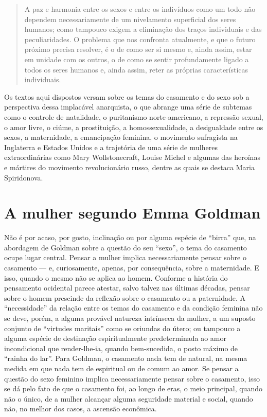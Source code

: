 \begin{quote}
A paz e harmonia entre os sexos e entre os indivíduos como um todo não
dependem necessariamente de um nivelamento superficial dos seres
humanos; como tampouco exigem a eliminação dos traços individuais e das
peculiaridades. O problema que nos confronta atualmente, e que o futuro
próximo precisa resolver, é o de como ser si mesmo e, ainda assim, estar
em unidade com os outros, o de como se sentir profundamente ligado a
todos os seres humanos e, ainda assim, reter as próprias características
individuais.
\end{quote}

Os textos aqui dispostos versam sobre os temas do casamento e do sexo
sob a perspectiva dessa implacável anarquista, o que abrange uma série
de subtemas como o controle de natalidade, o puritanismo
norte-americano, a repressão sexual, o amor livre, o ciúme, a
prostituição, a homossexualidade, a desigualdade entre os sexos, a
maternidade, a emancipação feminina, o movimento sufragista na
Inglaterra e Estados Unidos e a trajetória de uma série de mulheres
extraordinárias como Mary Wollstonecraft, Louise Michel e algumas das
heroínas e mártires do movimento revolucionário russo, dentre as quais
se destaca Maria Spiridonova.

\section{A mulher segundo Emma Goldman }

Não é por acaso, por gosto, inclinação ou por alguma espécie de
``birra'' que, na abordagem de Goldman sobre a questão do seu ``sexo'',
o tema do casamento ocupe lugar central. Pensar a mulher implica
necessariamente pensar sobre o casamento --- e, curiosamente, apenas, por
consequência, sobre a maternidade. E isso, quando o mesmo não se aplica
ao homem. Conforme a história do pensamento ocidental parece atestar,
salvo talvez nas últimas décadas, pensar sobre o homem prescinde da
reflexão sobre o casamento ou a paternidade. A ``necessidade'' da
relação entre os temas do casamento e da condição feminina não se deve,
porém, a alguma provável natureza intrínseca da mulher, a um suposto
conjunto de ``virtudes maritais'' como se oriundas do útero; ou tampouco
a alguma espécie de destinação espiritualmente predeterminada ao amor
incondicional que render-lhe-ia, quando bem-sucedida, o posto máximo de
``rainha do lar''. Para Goldman, o casamento nada tem de natural, na
mesma medida em que nada tem de espiritual ou de comum ao amor. Se
pensar a questão do sexo feminino implica necessariamente pensar sobre o
casamento, isso se dá pelo fato de que o casamento foi, ao longo de
eras, o meio principal, quando não o único, de a mulher alcançar alguma
seguridade material e social, quando não, no melhor dos casos, a
ascensão econômica.


